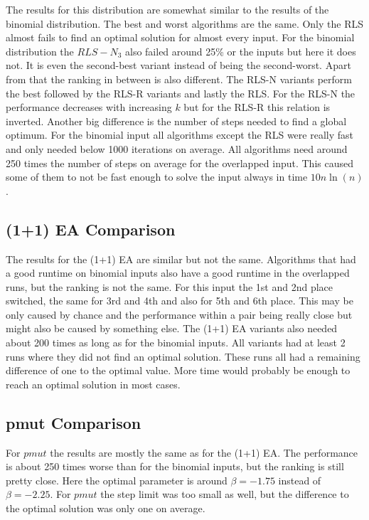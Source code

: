 The results for this distribution are somewhat similar to the results of the binomial distribution.
The best and worst algorithms are the same.
Only the RLS almost fails to find an optimal solution for almost every input.
For the binomial distribution the $RLS-N_3$ also failed around 25\% or the inputs but here it does not.
It is even the second-best variant instead of being the second-worst.
Apart from that the ranking in between is also different.
The RLS-N variants perform the best followed by the RLS-R variants and lastly the RLS.
For the RLS-N the performance decreases with increasing $k$ but for the RLS-R this relation is inverted.
Another big difference is the number of steps needed to find a global optimum.
For the binomial input all algorithms except the RLS were really fast and only needed below 1000 iterations on average.
All algorithms need around 250 times the number of steps on average for the overlapped input.
This caused some of them to not be fast enough to solve the input always in time $10n\ln(n)$.
\subsection{(1+1) EA Comparison}




The results for the (1+1) EA are similar but not the same.
Algorithms that had a good runtime on binomial inputs also have a good runtime in the overlapped runs, but the ranking is not the same.
For this input the 1st and 2nd place switched, the same for 3rd and 4th and also for 5th and 6th place.
This may be only caused by chance and the performance within a pair being really close but might also be caused by something else.
The (1+1) EA variants also needed about 200 times as long as for the binomial inputs.
All variants had at least 2 runs where they did not find an optimal solution.
These runs all had a remaining difference of one to the optimal value.
More time would probably be enough to reach an optimal solution in most cases.
\subsection{pmut Comparison}




For $pmut$ the results are mostly the same as for the (1+1) EA.
The performance is about 250 times worse than for the binomial inputs, but the ranking is still pretty close.
Here the optimal parameter is around $\beta=-1.75$ instead of $\beta=-2.25$.
For $pmut$ the step limit was too small as well, but the difference to the optimal solution was only one on average.
